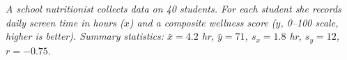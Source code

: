 \documentclass[10pt]{article}
\begin{document}
\namepartnerperiod

\vspace{0.12in}

\begin{tcolorbox}[colback=sky, colframe=navy, boxrule=0.9pt, arc=2mm,
    left=4mm, right=4mm, top=2.5mm, bottom=2.5mm]
\small\textit{A school nutritionist collects data on 40 students. For each student she records
daily screen time in hours ($x$) and a composite wellness score ($y$, 0--100 scale, higher is
better). Summary statistics: $\bar{x} = 4.2$ hr, $\bar{y} = 71$, $s_x = 1.8$ hr, $s_y = 12$,
$r = -0.75$.}
\end{tcolorbox}

\vspace{0.14in}
\end{document}
